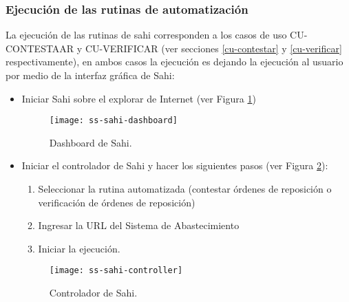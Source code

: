 \subsubsection{Ejecución de las rutinas de automatización}
La ejecución de las rutinas de sahi corresponden a los casos de uso CU-CONTESTAAR y 
CU-VERIFICAR (ver secciones \ref{cu-contestar} y \ref{cu-verificar} respectivamente), en ambos casos la ejecución es  
dejando la ejecución al usuario por medio de la interfaz gráfica de Sahi:
\begin{itemize}
	\item Iniciar Sahi sobre el explorar de Internet (ver Figura \ref{fig:ss-sahi-dashboard})
	\begin{figure}[h]
	\centering
	\texttt{[image: ss-sahi-dashboard]}
	\caption{Dashboard de Sahi.}
	\label{fig:ss-sahi-dashboard}
	\end{figure}

	\item Iniciar el controlador de Sahi y hacer los siguientes pasos (ver Figura \ref{fig:ss-sahi-controller}):
	\begin{enumerate}
		\item Seleccionar la rutina automatizada (contestar órdenes de reposición o verificación de órdenes de reposición)
		\item Ingresar la URL del Sistema de Abastecimiento
		\item Iniciar la ejecución.
	\end{enumerate}
	\begin{figure}[h]
	\centering
	\texttt{[image: ss-sahi-controller]}
	\caption{Controlador de Sahi.}
	\label{fig:ss-sahi-controller}
	\end{figure}
\end{itemize}


